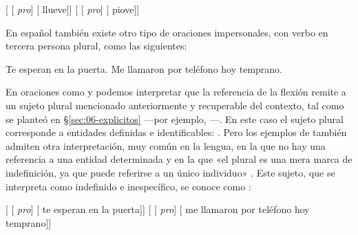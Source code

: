 \begin{exe}
  \ex\label{ex:06-llueve} {}[ [ \textit{pro}]
      [ llueve]]
  \ex\label{ex:06-piove} {}[ [ \textit{pro}]
      [ piove]]
\end{exe}

En español también existe otro tipo de oraciones impersonales, con verbo en
tercera persona plural, como las siguientes:

\begin{exe}
  \ex\label{ex:06-arb}
    \begin{xlist}
      \ex\label{ex:06-arb-a} Te esperan en la puerta.
      \ex\label{ex:06-arb-b} Me llamaron por teléfono hoy temprano.
    \end{xlist}
\end{exe}

En oraciones como  y  podemos interpretar
que la referencia de la flexión remite a un sujeto plural mencionado
anteriormente y recuperable del contexto, tal como se planteó en
§\ref{sec:06-explicitos} ---por ejemplo, ---. En este caso el sujeto plural corresponde a
entidades definidas e identificables: . Pero los
ejemplos de  también admiten otra interpretación, muy común en
la lengua, en la que no hay una referencia a una entidad determinada y en la que
«el plural es una mera marca de indefinición, ya que puede referirse a un único
individuo» \parencite[109]{ditullio2014}. Este sujeto, que se interpreta como
indefinido e inespecífico, se conoce como :

\begin{exe}
  \ex
    \begin{xlist}
      \ex {}[ [ \textit{pro}] [ te
          esperan en la puerta]]
      \ex {}[ [ \textit{pro}] [ me
          llamaron por teléfono hoy temprano]]
    \end{xlist}
\end{exe}

